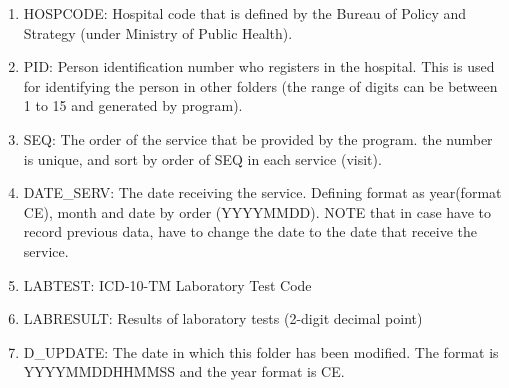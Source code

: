 \begin{enumerate}
  \item HOSPCODE: Hospital code that is defined by the Bureau of Policy and Strategy (under Ministry of Public Health). 
  \item PID: Person identification number who registers in the hospital. This is used for identifying the person in other folders (the range of digits can be between 1 to 15 and generated by program).
  \item SEQ: The order of the service that be provided by the program. the number is unique, and sort by order of SEQ in each service (visit). 
  \item DATE\_SERV: The date receiving the service. Defining format as year(format CE), month and date by order (YYYYMMDD). NOTE that in case have to record previous data, have to change the date to the date that receive the service.
  \item LABTEST: ICD-10-TM Laboratory Test Code
  \item LABRESULT: Results of laboratory tests (2-digit decimal point)
  \item D\_UPDATE:  The date in which this folder has been modified. The format is YYYYMMDDHHMMSS and the year format is CE.
\end{enumerate}